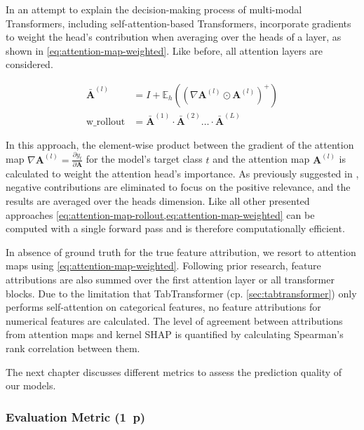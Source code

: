 In an attempt to explain the decision-making process of multi-modal Transformers, including self-attention-based Transformers, \textcite[][3]{cheferTransformerInterpretabilityAttention2021} incorporate gradients to weight the head's contribution when averaging over the heads of a layer, as shown in \cref{eq:attention-map-weighted}. Like before, all attention layers are considered.

\begin{equation}
    \begin{aligned}
        \bar{\boldsymbol{A}}^{(l)} & =I+ \mathbb{E}_h\left(\left(\nabla \boldsymbol{A}^{(l)} \odot \boldsymbol{A}^{(l)}\right)^{+}\right) \\
        \operatorname {w\_rollout} & =\bar{\boldsymbol{A}}^{(1)} \cdot \bar{\boldsymbol{A}}^{(2)} \ldots \cdot \bar{\boldsymbol{A}}^{(L)}
    \end{aligned}
    \label{eq:attention-map-weighted}
\end{equation}

In this approach, the element-wise product between the gradient of the attention map $\nabla \boldsymbol{A}^{(l)}=\frac{\partial y_t}{\partial \boldsymbol{A}}$ for the model's target class $t$ and the attention map $\boldsymbol{A}^{(l)}$ is calculated to weight the attention head's importance. As previously suggested in \textcite[][786]{cheferTransformerInterpretabilityAttention2021}, negative contributions are eliminated to focus on the positive relevance, and the results are averaged over the heads dimension. Like all other presented approaches \cref{eq:attention-map-rollout,eq:attention-map-weighted} can be computed with a single forward pass and is therefore computationally efficient.

In absence of ground truth for the true feature attribution, we resort to attention maps using \cref{eq:attention-map-weighted}. Following prior research, feature attributions are also summed over the first attention layer or all transformer blocks. Due to the limitation that TabTransformer (cp. \cref{sec:tabtransformer}) only performs self-attention on categorical features, no feature attributions for numerical features are calculated. The level of agreement between attributions from attention maps and kernel \gls{SHAP} is quantified by calculating Spearman's rank correlation between them.

The next chapter discusses different metrics to assess the prediction quality of our models.

\subsubsection{Evaluation Metric (1~p)}\label{sec:evaluation-metric}


